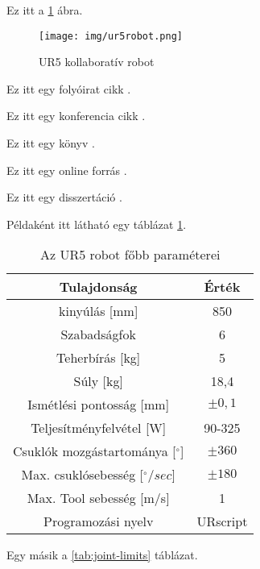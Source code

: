
Ez itt a \ref{fig:ur5} ábra.
\begin{figure}[H]
	\centering
	\texttt{[image: img/ur5robot.png]}
	\caption{UR5 kollaboratív robot}
	\label{fig:ur5}
\end{figure}



Ez itt egy folyóirat cikk \cite{journal-example}.

Ez itt egy konferencia cikk \cite{conference-example}.

Ez itt egy könyv \cite{book-example}.

Ez itt egy online forrás \cite{online-example}.

Ez itt egy disszertáció \cite{thesis-example}.

Példaként itt látható egy táblázat \ref{tab:ur5}.

\begin{table}[H]
	\centering
	\begin{tabular}{|c|c|}
	    \hline
		Tulajdonság                      & Érték    \\ \hline
		kinyúlás {[}mm{]}                & 850      \\ \hline
		Szabadságfok                     & 6        \\ \hline
		Teherbírás {[}kg{]}               & 5        \\ \hline
		Súly {[}kg{]}                    & 18,4     \\ \hline
		Ismétlési pontosság {[}mm{]}     & $\pm0,1$    \\ \hline
		Teljesítményfelvétel {[}W{]}     & 90-325   \\ \hline
		Csuklók mozgástartománya {[}$^{\circ}${]} & $\pm360$    \\ \hline
		Max. csuklósebesség {[}$^{\circ}/sec${]}  & $\pm180$    \\ \hline
		Max. Tool sebesség {[}m/s{]}     & 1        \\ \hline
		Programozási nyelv               & URscript \\ \hline
	\end{tabular}
	\caption{Az UR5 robot főbb paraméterei}
	\label{tab:ur5}
\end{table}

Egy másik a \ref{tab:joint-limits} táblázat.

